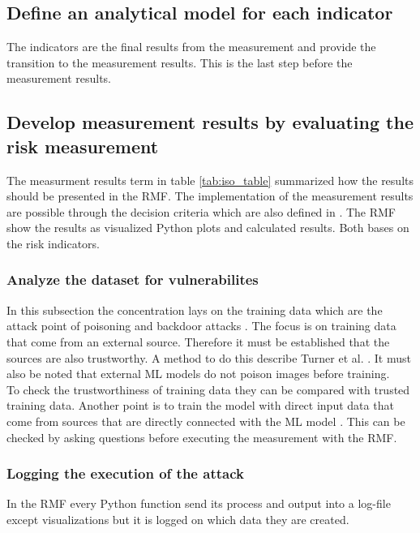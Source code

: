 \subsection{Define an analytical model for each indicator}

The indicators are the final results from the measurement and provide the transition to the measurement results. This is the last step before the measurement results.

\subsection{Develop measurement results by evaluating the risk measurement}

The measurment results term in table \ref{tab:iso_table} summarized how the results should be presented in the RMF. The implementation of the measurement results are possible through the decision criteria which are also defined in \cite{ISO_27004_2009}. The RMF show the results as visualized Python plots and calculated results. Both bases on the risk indicators.

\subsubsection*{Analyze the dataset for vulnerabilites}

In this subsection the concentration lays on the training data which are the attack point of poisoning and backdoor attacks \cite{DBLP:conf/eusipco/ArshadAQLY21}. The focus is on training data that come from an external source. Therefore it must be established that the sources are also trustworthy. A method to do this describe Turner et al. \cite{turner2018clean}. It must also be noted that external ML models do not poison images before training. \\
To check the trustworthiness of training data they can be compared with trusted training data. Another point is to train the model with direct input data that come from sources that are directly connected with the ML model \cite{DBLP:conf/sp/XiaoLZX18}. This can be checked by asking questions before executing the measurement with the RMF.

\subsubsection*{Logging the execution of the attack}

In the RMF every Python function send its process and output into a log-file except visualizations but it is logged on which data they are created.

